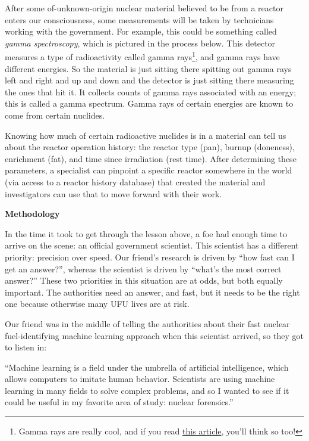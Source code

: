 {After some of-unknown-origin nuclear material believed to be from a reactor
enters our consciousness, some measurements will be taken by technicians
working with the government. For example, this could be something called
\textit{gamma spectroscopy}, which is pictured in the process below. This
detector measures a type of radioactivity called gamma rays\footnote{Gamma rays
are really cool, and if you read
\href{https://www.symmetrymagazine.org/article/incredible-hulking-facts-about-gamma-rays}{\color{violet}this
article}, you'll think so too!}, and gamma rays have different energies. So the
material is just sitting there spitting out gamma rays left and right and up
and down and the detector is just sitting there measuring the ones that hit it.
It collects counts of gamma rays associated with an energy; this is called a
gamma spectrum. Gamma rays of certain energies are known to come from certain
nuclides. 

Knowing how much of certain radioactive nuclides is in a material can
tell us about the reactor operation history: the reactor type (pan), burnup
(doneness), enrichment (fat), and time since irradiation (rest time). After
determining these parameters, a specialist can pinpoint a specific reactor
somewhere in the world (via access to a reactor history database) that created
the material and investigators can use that to move forward with their work.

\begin{tcolorbox}[halign=center]
\textbf{Methodology}
\end{tcolorbox}

\begin{shadequote}

  In the time it took to get through the lesson above, a foe had enough time to
  arrive on the scene: an official government scientist. This scientist has a
  different priority: precision over speed. Our friend's research is driven by
  ``how fast can I get an answer?'', whereas the scientist is driven by
  ``what's the most correct answer?'' These two priorities in this situation
  are at odds, but both equally important. The authorities need an answer, and
  fast, but it needs to be the right one because otherwise many UFU lives are
  at risk.
  
  Our friend was in the middle of telling the authorities about their fast
  nuclear fuel-identifying machine learning approach when this scientist
  arrived, so they got to listen in:
  
  ``Machine learning is a field under the umbrella of artificial intelligence,
  which allows computers to imitate human behavior. Scientists are using
  machine learning in many fields to solve complex problems, and so I wanted to
  see if it could be useful in my favorite area of study: nuclear forensics.''
  

\end{shadequote}}
